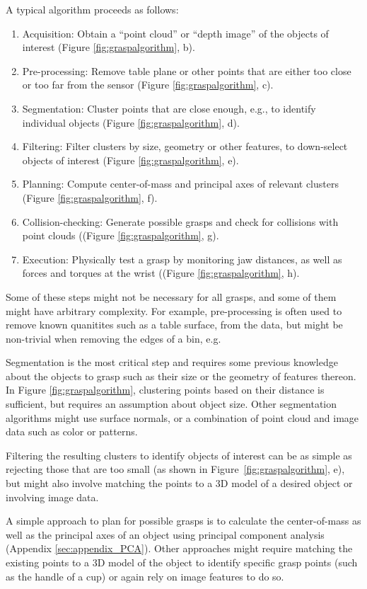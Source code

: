 A typical algorithm proceeds as follows:
\begin{enumerate}
\item Acquisition: Obtain a ``point cloud'' or ``depth image'' of the objects of interest (Figure \ref{fig:graspalgorithm}, b).
\item Pre-processing: Remove table plane or other points that are either too close or too far from the sensor (Figure \ref{fig:graspalgorithm}, c).
\item Segmentation: Cluster points that are close enough, e.g., to identify individual objects (Figure \ref{fig:graspalgorithm}, d).
\item Filtering: Filter clusters by size, geometry or other features, to down-select objects of interest (Figure \ref{fig:graspalgorithm}, e).
\item Planning: Compute center-of-mass and principal axes of relevant clusters (Figure \ref{fig:graspalgorithm}, f).
\item Collision-checking: Generate possible grasps and check for collisions with point clouds ((Figure \ref{fig:graspalgorithm}, g).
\item Execution: Physically test a grasp by monitoring jaw distances, as well as forces and torques at the wrist ((Figure \ref{fig:graspalgorithm}, h).
\end{enumerate}

Some of these steps might not be necessary for all grasps, and some of them might have arbitrary complexity. For example, pre-processing is often used to remove known quanitites such as a table surface, from the data, but might be non-trivial when removing the edges of a bin, e.g. 

Segmentation is the most critical step and requires some previous knowledge about the objects to grasp such as their size or the geometry of features thereon. In Figure \ref{fig:graspalgorithm}, clustering points based on their distance is sufficient, but requires an assumption about object size. Other segmentation algorithms might use surface normals, or a combination of point cloud and image data such as color or patterns. 

Filtering the resulting clusters to identify objects of interest can be as simple as rejecting those that are too small (as shown in Figure~\ref{fig:graspalgorithm}, e), but might also involve matching the points to a 3D model of a desired object or involving image data. 

A simple approach to plan for possible grasps is to calculate the center-of-mass as well as the principal axes of an object using principal component analysis (Appendix \ref{sec:appendix_PCA}). Other approaches might require matching the existing points to a 3D model of the object to identify specific grasp points (such as the handle of a cup) or again rely on image features to do so.

